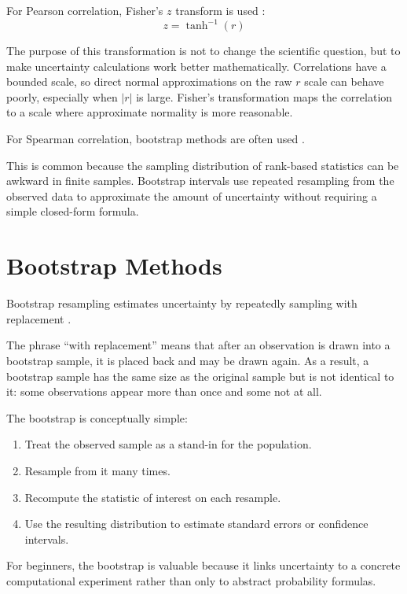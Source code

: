 \documentclass[11pt]{article}
\begin{document}
For Pearson correlation, Fisher's $z$ transform is used \citep{fisher1921probable}:
\begin{equation}
z = \tanh^{-1}(r)
\end{equation}

The purpose of this transformation is not to change the scientific question, but to make uncertainty calculations work better mathematically. Correlations have a bounded scale, so direct normal approximations on the raw $r$ scale can behave poorly, especially when $|r|$ is large. Fisher's transformation maps the correlation to a scale where approximate normality is more reasonable.

For Spearman correlation, bootstrap methods are often used \citep{efron1994introduction}.

This is common because the sampling distribution of rank-based statistics can be awkward in finite samples. Bootstrap intervals use repeated resampling from the observed data to approximate the amount of uncertainty without requiring a simple closed-form formula.

\section{Bootstrap Methods}

Bootstrap resampling estimates uncertainty by repeatedly sampling with replacement \citep{efron1979bootstrap}.

The phrase ``with replacement'' means that after an observation is drawn into a bootstrap sample, it is placed back and may be drawn again. As a result, a bootstrap sample has the same size as the original sample but is not identical to it: some observations appear more than once and some not at all.

The bootstrap is conceptually simple:
\begin{enumerate}
\item Treat the observed sample as a stand-in for the population.
\item Resample from it many times.
\item Recompute the statistic of interest on each resample.
\item Use the resulting distribution to estimate standard errors or confidence intervals.
\end{enumerate}

For beginners, the bootstrap is valuable because it links uncertainty to a concrete computational experiment rather than only to abstract probability formulas.
\end{document}
